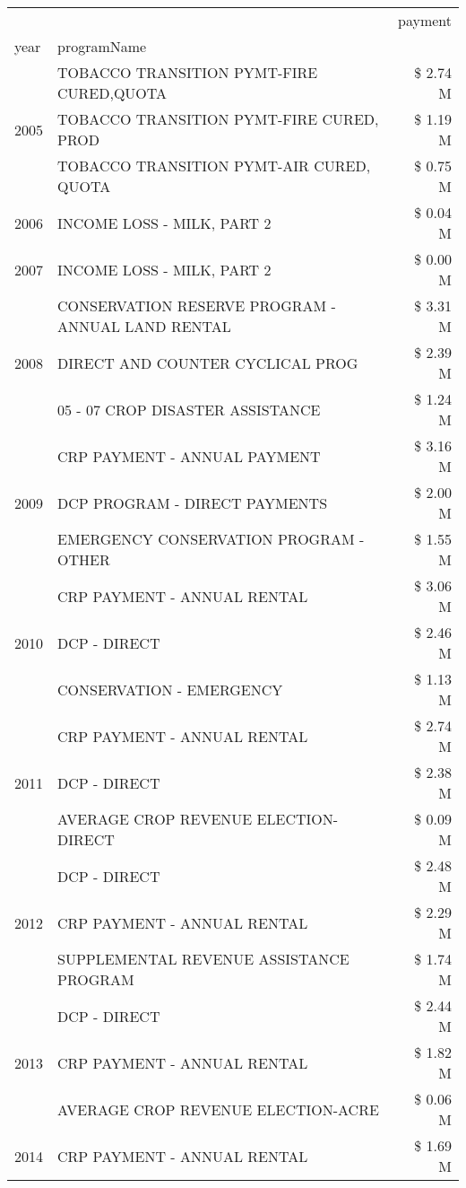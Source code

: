 \begin{tabular}{llr}
\toprule
 &  & payment \\
year & programName &  \\
\midrule
\multirow[t]{3}{*}{2005} & TOBACCO TRANSITION PYMT-FIRE CURED,QUOTA & \$ 2.74 M \\
 & TOBACCO TRANSITION PYMT-FIRE CURED, PROD & \$ 1.19 M \\
 & TOBACCO TRANSITION PYMT-AIR CURED, QUOTA & \$ 0.75 M \\
\cline{1-3}
2006 & INCOME LOSS - MILK, PART 2 & \$ 0.04 M \\
\cline{1-3}
2007 & INCOME LOSS - MILK, PART 2 & \$ 0.00 M \\
\cline{1-3}
\multirow[t]{3}{*}{2008} & CONSERVATION RESERVE PROGRAM - ANNUAL LAND RENTAL & \$ 3.31 M \\
 & DIRECT AND COUNTER CYCLICAL PROG & \$ 2.39 M \\
 & 05 - 07 CROP DISASTER ASSISTANCE & \$ 1.24 M \\
\cline{1-3}
\multirow[t]{3}{*}{2009} & CRP PAYMENT - ANNUAL PAYMENT & \$ 3.16 M \\
 & DCP PROGRAM - DIRECT PAYMENTS & \$ 2.00 M \\
 & EMERGENCY CONSERVATION PROGRAM - OTHER & \$ 1.55 M \\
\cline{1-3}
\multirow[t]{3}{*}{2010} & CRP PAYMENT - ANNUAL RENTAL & \$ 3.06 M \\
 & DCP - DIRECT & \$ 2.46 M \\
 & CONSERVATION - EMERGENCY & \$ 1.13 M \\
\cline{1-3}
\multirow[t]{3}{*}{2011} & CRP PAYMENT - ANNUAL RENTAL & \$ 2.74 M \\
 & DCP - DIRECT & \$ 2.38 M \\
 & AVERAGE CROP REVENUE ELECTION-DIRECT & \$ 0.09 M \\
\cline{1-3}
\multirow[t]{3}{*}{2012} & DCP - DIRECT & \$ 2.48 M \\
 & CRP PAYMENT - ANNUAL RENTAL & \$ 2.29 M \\
 & SUPPLEMENTAL REVENUE ASSISTANCE PROGRAM & \$ 1.74 M \\
\cline{1-3}
\multirow[t]{3}{*}{2013} & DCP - DIRECT & \$ 2.44 M \\
 & CRP PAYMENT - ANNUAL RENTAL & \$ 1.82 M \\
 & AVERAGE CROP REVENUE ELECTION-ACRE & \$ 0.06 M \\
\cline{1-3}
\multirow[t]{3}{*}{2014} & CRP PAYMENT - ANNUAL RENTAL & \$ 1.69 M \\

\end{tabular}
